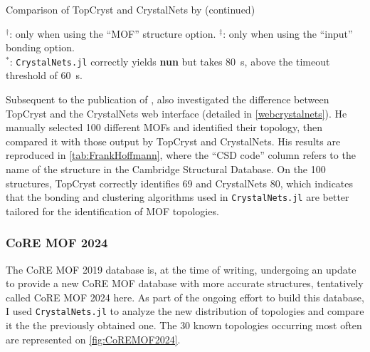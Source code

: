 \documentclass[main.tex]{subfiles}
\begin{document}
\begin{table}
	\caption{Comparison of TopCryst\autocite{TopCryst} and CrystalNets by \textcite{FrankHoffmann} (continued)}
	\normalsize
	$^\dagger$: only when using the ``MOF'' structure option. $^\ddagger$: only when using the ``input'' bonding option.\\
	$^*$: \texttt{CrystalNets.jl} correctly yields \textbf{nun} but takes \qty{80}{s}, above the timeout threshold of \qty{60}{s}.
\end{table}

Subsequent to the publication of \cite{CrystalNets}, \textcite{FrankHoffmann} also investigated the difference between TopCryst and the CrystalNets web interface (detailed in \cref{webcrystalnets}). He manually selected \num{100} different MOFs and identified their topology, then compared it with those output by TopCryst and CrystalNets. His results are reproduced in \cref{tab:FrankHoffmann}, where the ``CSD code'' column refers to the name of the structure in the Cambridge Structural Database\autocite{CSD}. On the \num{100} structures, TopCryst correctly identifies \num{69} and CrystalNets \num{80}, which indicates that the bonding and clustering algorithms used in \texttt{CrystalNets.jl} are better tailored for the identification of MOF topologies.

\subsubsection{CoRE MOF 2024}

The CoRE MOF 2019 database is, at the time of writing, undergoing an update to provide a new CoRE MOF database with more accurate structures, tentatively called CoRE MOF 2024 here. As part of the ongoing effort to build this database, I used \texttt{CrystalNets.jl} to analyze the new distribution of topologies and compare it the the previously obtained one. The 30 known topologies occurring most often are represented on \cref{fig:CoREMOF2024}.
\end{document}
